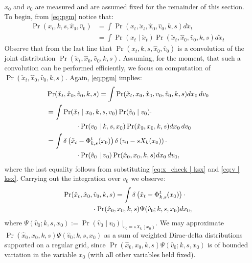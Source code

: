 \documentclass[letterpaper,10pt,conference]{ieeeconf}
\begin{document}
$\hat{x}_0$ and $\hat{v}_0$ are measured and are assumed fixed for the remainder of this section.
To begin, from \eqref{eq:pgm}  notice that:
\begin{align}
	\Pr( x_t, k,s,\hat{x}_0, \hat{v}_0) &= \int \Pr( x_t, \check{x}_t , \hat{x}_0, \hat{v}_0, k,s) d\check{x}_t  \label{eq:convolve} \\
	&= \int \Pr( x_t \mid \check{x}_t ) \Pr(\check{x}_t , \hat{x}_0, \hat{v}_0, k,s) d\check{x}_t \nonumber
\end{align}
Observe that from the last line that $\Pr( x_t, k,s, \hat{x}_0, \hat{v}_0)$ is a convolution of the joint distribution $\Pr( \check{x}_t , \hat{x}_0, \hat{v}_0, k,s)$.
Assuming, for the moment, that such a convolution can be performed efficiently, we focus on computation of $\Pr( \check{x}_t , \hat{x}_0, \hat{v}_0, k,s)$.
Again, \eqref{eq:pgm} implies:
\begin{align}
	&\Pr( \check{x}_t , \hat{x}_0, \hat{v}_0, k,s) =\int \Pr( \check{x}_t , x_0, \hat{x}_0, v_0, \hat{v}_0, k,s) dx_0 \, dv_0 \nonumber \\
	&= \int \Pr( \check{x}_t \mid  x_0, k,s, v_0) \Pr( \hat{v}_0 \mid v_0) \cdot \\
	& \hspace{10ex}  \cdot \Pr( v_0 \mid k,s,x_0) \Pr(\hat{x}_0, x_0, k, s) dx_0 \, dv_0 \nonumber \\
		&= \int \delta\left( \check{x}_t - \Phi_{k,s}^{t}( x_0) \right) \delta\left( v_0 - s X_k (x_0) \right) \cdot \\
		&\hspace{10ex} \cdot\Pr( \hat{v}_0 \mid v_0) \Pr(\hat{x}_0, x_0,k, s) dx_0\, dv_0, \nonumber
\end{align}
where the last equality follows from substituting \eqref{eq:x_check | ksx} and \eqref{eq:v | ksx}.
 Carrying out the integration over $v_0$ we observe:
\begin{align}
\begin{split}
	&\Pr( \check{x}_t , \hat{x}_0, \hat{v}_0, k,s) = \int \delta\left( \check{x}_t - \Phi_{k,s}^{t}( x_0) \right)  \cdot \\
	&\hspace{10ex} \cdot \Pr(\hat{x}_0, x_0, k, s) \Psi(\hat{v}_0 ;k,s,x_0) dx_0,
\end{split}
\label{eq:push forward}
\end{align}
 where $\Psi( \hat{v}_0 ;k,s,x_0) := \left. \Pr( \hat{v}_0 \mid v_0) \right|_{v_0 = s X_k(x_0)}$.
 We may approximate $\Pr(\hat{x}_0, x_0, k, s) \Psi( \hat{v}_0 ; k, s, x_0)$ as a sum of weighted Dirac-delta distributions supported on a regular grid, since $\Pr(\hat{x}_0, x_0, k, s) \Psi( \hat{v}_0 ; k, s, x_0)$  is of bounded variation in the variable $x_0$ (with all other variables held fixed).
 
\end{document}

